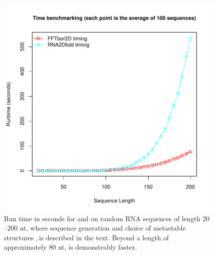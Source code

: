 \begin{figure}[!h]
\centering
\includegraphics[width=.9\textwidth]{Figures/FFTbor2D/ffttwoRtwofoldTiming.pdf}
 \caption{
Run time in seconds for \rtwofold and \ffttwo on random
RNA sequences of length $20$--$200$ nt, where sequence generation and
choice of metastable structures \strA,\,\strB is described in the text.
Beyond a length of approximately $80$ nt, \ffttwo is demonstrably
faster.
}
\label{fig:ffttwo:ffttwoRtwofoldTiming}
\end{figure}

